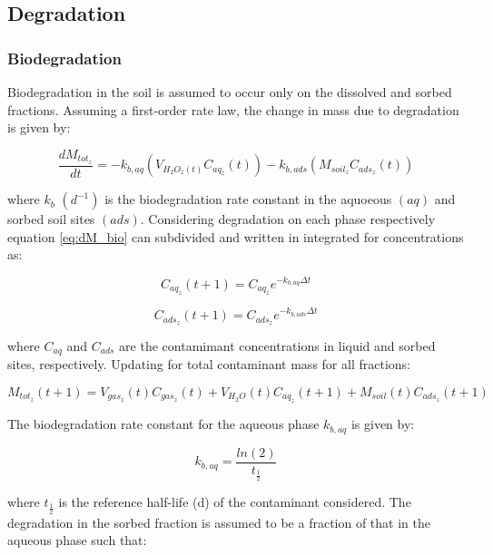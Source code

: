 \documentclass[]{article}
\begin{document}
\subsection{Degradation}\label{degradation}

\subsubsection{Biodegradation}\label{biodegradation}

Biodegradation in the soil is assumed to occur only on the dissolved and
sorbed fractions. Assuming a first-order rate law, the change in mass
due to degradation is given by:

\begin{equation}
\frac{dM_{tot_z}}{dt} = -k_{b,aq}(V_{H_2O_z(t)}C_{aq_z}(t))-k_{b,ads}(M_{soil_z}C_{ads_z}(t))
\label{eq:dM_bio}
\end{equation}

where \(k_{b}\) \((d^{-1})\) is the biodegradation rate constant in the
aquoeous \((aq)\) and sorbed soil sites \((ads)\). Considering
degradation on each phase respectively equation \ref{eq:dM_bio} can
subdivided and written in integrated for concentrations as:

\begin{equation}
C_{aq_z}(t+1) = C_{aq_z}e^{-k_{b,aq} \Delta t} 
\label{eq:Maq_t1}
\end{equation}

\begin{equation}
C_{ads_z}(t+1) = C_{ads_z}e^{-k_{b,ads} \Delta t}
\label{eq:Mads_t1}
\end{equation}

where \(C_{aq}\) and \(C_{ads}\) are the contamimant concentrations in
liquid and sorbed sites, respectively. Updating for total contaminant
mass for all fractions:

\begin{equation}
M_{tot_z}(t+1) = V_{gas_z}(t)C_{gas_z}(t) + V_{H_2O}(t)C_{aq_z}(t+1) + M_{soil}(t)C_{ads_z}(t+1)
\label{eq:Mtot_t1}
\end{equation}

The biodegradation rate constant for the aqueous phase \(k_{b,aq}\) is
given by:

\begin{equation}
k_{b,aq} = \frac{ln(2)}{t_\frac{1}{2}} 
\label{eq:k_b}
\end{equation}

where \(t_\frac{1}{2}\) is the reference half-life (d) of the
contaminant considered. The degradation in the sorbed fraction is
assumed to be a fraction of that in the aqueous phase such that:
\end{document}
